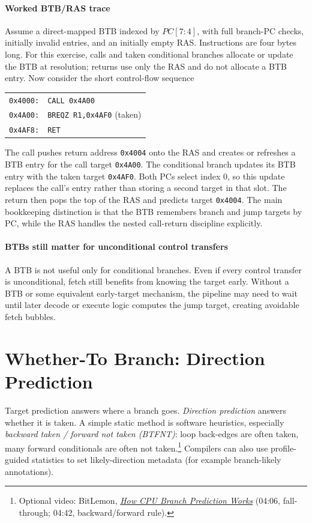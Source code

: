 \paragraph{Worked BTB/RAS trace}\label{par:auto-025j}
Assume a direct-mapped BTB indexed by $PC[7:4]$, with full branch-PC checks, initially invalid entries, and an initially empty RAS.
Instructions are four bytes long.
For this exercise, calls and taken conditional branches allocate or update the BTB at resolution; returns use only the RAS and do not allocate a BTB entry.
Now consider the short control-flow sequence
\begin{center}
    \begin{tabular}{@{}ll@{}}
        \texttt{0x4000:} & \texttt{CALL 0x4A00}             \\
        \texttt{0x4A00:} & \texttt{BREQZ R1,0x4AF0} (taken) \\
        \texttt{0x4AF8:} & \texttt{RET}
    \end{tabular}
\end{center}
The call pushes return address \texttt{0x4004} onto the RAS and creates or refreshes a BTB entry for the call target \texttt{0x4A00}.
The conditional branch updates its BTB entry with the taken target \texttt{0x4AF0}.
Both PCs select index 0, so this update replaces the call's entry rather than storing a second target in that slot.
The return then pops the top of the RAS and predicts target \texttt{0x4004}.
The main bookkeeping distinction is that the BTB remembers branch and jump targets by PC, while the RAS handles the nested call-return discipline explicitly.

\paragraph{BTBs still matter for unconditional control transfers}\label{par:auto-025i}
A BTB is not useful only for conditional branches.
Even if every control transfer is unconditional, fetch still benefits from knowing the target early.
Without a BTB or some equivalent early-target mechanism, the pipeline may need to wait until later decode or execute logic computes the jump target, creating avoidable fetch bubbles.


\section{Whether-To Branch: Direction Prediction}\label{sec:auto-043}
Target prediction answers where a branch goes.
\textit{Direction prediction} answers whether it is taken.
A simple static method is software heuristics, especially \textit{backward taken / forward not taken (BTFNT)}: loop back-edges are often taken, many forward conditionals are often not taken.\footnote{Optional video: BitLemon, \href{https://youtu.be/UbDIoNY9E0w?t=246}{\emph{How CPU Branch Prediction Works}} (04:06, fall-through; 04:42, backward/forward rule).}
Compilers can also use profile-guided statistics to set likely-direction metadata (for example branch-likely annotations).

